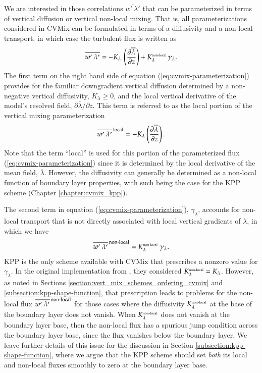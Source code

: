 We are interested in those correlations $\overline{w' \, \lambda'}$
that can be parameterized in terms of vertical diffusion or vertical
non-local mixing.  That is, all parameterizations considered in CVMix
can be formulated in terms of a diffusivity and a non-local transport,
in which case the turbulent flux is written as
\begin{equation}
  \overline{w' \, \lambda'} = 
  -K_{\lambda} \,  \left(  \frac{\partial \overline{\lambda}}{\partial z} \right)
 + K^{\mbox{\tiny non-local}}_{\lambda} \,  \gamma_{\lambda}.
\label{eq:cvmix-parameterization}
\end{equation}
The first term on the right hand side of equation
(\ref{eq:cvmix-parameterization}) provides for the familiar
downgradient vertical diffusion determined by a non-negative vertical
diffusivity, $K_{\lambda} \ge 0$, and the local vertical derivative of
the model's resolved field, $\partial \overline{\lambda} / \partial
z$.  This term is referred to as the local portion of the vertical
mixing parameterization
\begin{equation}
\overline{ w' \, \lambda' }^{\, \mbox{\scriptsize local}} = -K_{\lambda} \left( \frac{\partial \overline{\lambda}}{\partial z} \right).
\end{equation}
Note that the term ``local'' is used for this portion of the
parameterized flux (\ref{eq:cvmix-parameterization}) since it is
determined by the local derivative of the mean field,
$\overline{\lambda}$.  However, the diffusivity can generally be
determined as a non-local function of boundary layer properties, with
such being the case for the KPP scheme (Chapter
\ref{chapter:cvmix_kpp}).  

The second term in equation (\ref{eq:cvmix-parameterization}),
$\gamma_{\lambda}$, accounts for non-local transport that is not
directly associated with local vertical gradients of $\lambda$, in
which we have
\begin{equation}
\overline{w' \, \lambda'}^{\, \mbox{\scriptsize non-local}} = K^{\mbox{\tiny non-local}}_{\lambda}  \; \gamma_{\lambda}.
\end{equation}
KPP is the only scheme available with CVMix that prescribes a nonzero
value for $\gamma_{\lambda}$.  In the original implementation from
\cite{LargeKPP}, they considered $K^{\mbox{\tiny non-local}}_{\lambda}
= K_{\lambda}$. However, as noted in Sections
\ref{section:vert_mix_schemes_ordering_cvmix} and
\ref{subsection:kpp-shape-function}, that prescription leads to
problems for the non-local flux $\overline{w' \, \lambda'}^{\,
  \mbox{\scriptsize non-local}}$ for those cases where the diffusivity
$K^{\mbox{\tiny non-local}}_{\lambda}$ at the base of the boundary
layer does not vanish.  When $K^{\mbox{\tiny non-local}}_{\lambda}$
does not vanish at the boundary layer base, then the non-local flux
has a spurious jump condition across the boundary layer base, since
the flux vanishes below the boundary layer. We leave further details
of this issue for the discussion in Section
\ref{subsection:kpp-shape-function}, where we argue that the KPP
scheme should set {\it both} its local and non-local fluxes smoothly
to zero at the boundary layer base.

